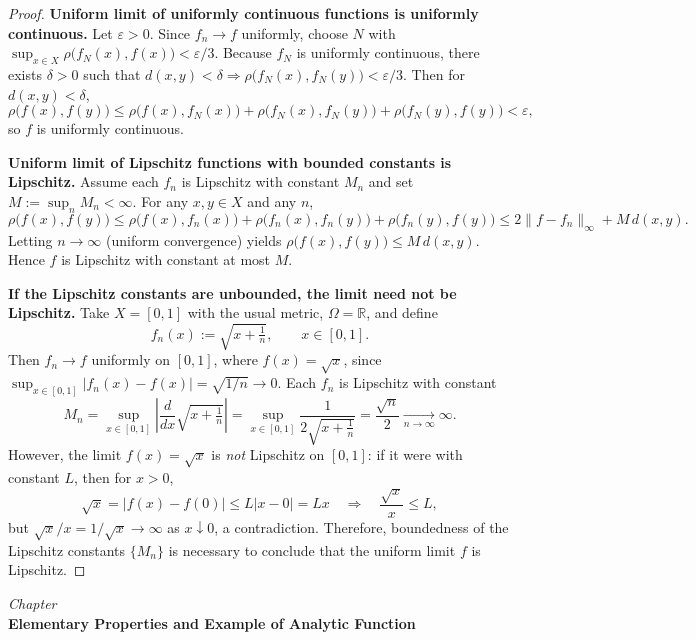 \documentclass[12pt, a4paper]{report}
\newcommand{\chapter}[1]{%
  \par\vspace{2em}%
  \refstepcounter{section}%
  \begin{center}
    \textit{Chapter \thesection} \\[1.5ex]
    \textbf{#1}
  \end{center}
  \vspace{1em}%
}
\theoremstyle{spaced}
\begin{document}
\begin{proof}
	\textbf{Uniform limit of uniformly continuous functions is uniformly continuous.}
	Let $\varepsilon>0$. Since $f_n \to f$ uniformly, choose $N$ with
	$\sup_{x\in X}\rho\!\bigl(f_N(x),f(x)\bigr) < \varepsilon/3$.
	Because $f_N$ is uniformly continuous, there exists $\delta>0$ such that
	$d(x,y)<\delta \Rightarrow \rho\!\bigl(f_N(x),f_N(y)\bigr)<\varepsilon/3$.
	Then for $d(x,y)<\delta$,
	\[
		\rho\!\bigl(f(x),f(y)\bigr)
		\le \rho\!\bigl(f(x),f_N(x)\bigr)+\rho\!\bigl(f_N(x),f_N(y)\bigr)+\rho\!\bigl(f_N(y),f(y)\bigr)
		< \varepsilon,
	\]
	so $f$ is uniformly continuous.

	\medskip
	\textbf{Uniform limit of Lipschitz functions with bounded constants is Lipschitz.}
	Assume each $f_n$ is Lipschitz with constant $M_n$ and set $M:=\sup_n M_n<\infty$.
	For any $x,y\in X$ and any $n$,
	\[
		\rho\!\bigl(f(x),f(y)\bigr)
		\le \rho\!\bigl(f(x),f_n(x)\bigr) + \rho\!\bigl(f_n(x),f_n(y)\bigr) + \rho\!\bigl(f_n(y),f(y)\bigr)
		\le 2\|f-f_n\|_\infty + M\, d(x,y).
	\]
	Letting $n\to\infty$ (uniform convergence) yields $\rho\!\bigl(f(x),f(y)\bigr)\le M\,d(x,y)$.
	Hence $f$ is Lipschitz with constant at most $M$.

	\medskip
	\textbf{If the Lipschitz constants are unbounded, the limit need not be Lipschitz.}
	Take $X=[0,1]$ with the usual metric, $\Omega=\mathbb{R}$, and define
	\[
		f_n(x):=\sqrt{x+\tfrac{1}{n}}, \qquad x\in[0,1].
	\]
	Then $f_n \to f$ uniformly on $[0,1]$, where $f(x)=\sqrt{x}$, since
	$\sup_{x\in[0,1]}|f_n(x)-f(x)| = \sqrt{1/n}\to0$.
	Each $f_n$ is Lipschitz with constant
	\[
		M_n=\sup_{x\in[0,1]} \left|\frac{d}{dx}\sqrt{x+\tfrac{1}{n}}\right|
		= \sup_{x\in[0,1]} \frac{1}{2\sqrt{x+\tfrac{1}{n}}} = \frac{\sqrt{n}}{2}\xrightarrow[n\to\infty]{}\infty.
	\]
	However, the limit $f(x)=\sqrt{x}$ is \emph{not} Lipschitz on $[0,1]$:
	if it were with constant $L$, then for $x>0$,
	\[
		\sqrt{x} = |f(x)-f(0)| \le L |x-0| = Lx \quad\Longrightarrow\quad \frac{\sqrt{x}}{x}\le L,
	\]
	but $\sqrt{x}/x=1/\sqrt{x}\to\infty$ as $x\downarrow0$, a contradiction.
	Therefore, boundedness of the Lipschitz constants $\{M_n\}$ is necessary to conclude
	that the uniform limit $f$ is Lipschitz.
\end{proof}

\newpage

\chapter{Elementary Properties and Example of Analytic Function}
\end{document}

